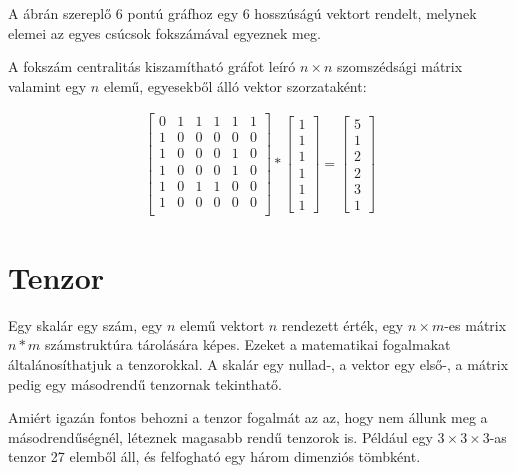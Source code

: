 \documentclass[12pt,numbers=noenddot]{report}
\begin{document}
\vspace{0.5cm}

A ábrán szereplő 6 pontú gráfhoz egy 6 hosszúságú vektort rendelt, 
melynek elemei az egyes csúcsok fokszámával egyeznek meg.

A fokszám centralitás kiszamítható gráfot leíró $n \times n$ szomszédsági 
mátrix valamint egy $n$ elemű, egyesekből álló vektor szorzataként:

\begin{align}
	\begin{bmatrix}
		0 & 1 & 1 & 1 & 1 & 1 \\
		1 & 0 & 0 & 0 & 0 & 0 \\
		1 & 0 & 0 & 0 & 1 & 0 \\
		1 & 0 & 0 & 0 & 1 & 0 \\
		1 & 0 & 1 & 1 & 0 & 0 \\
		1 & 0 & 0 & 0 & 0 & 0 \\
	\end{bmatrix}
	*
	\begin{bmatrix}
		1\\
		1\\
		1\\
		1\\
		1\\
		1
	\end{bmatrix}
	=
	\begin{bmatrix}
		5\\
		1\\
		2\\
		2\\
		3\\
		1
	\end{bmatrix}
\end{align}


\section{Tenzor}

Egy skalár egy szám, egy $n$ elemű vektort $n$ rendezett érték, egy 
$n \times m$-es mátrix $n*m$ számstruktúra tárolására képes. 
Ezeket a matematikai fogalmakat általánosíthatjuk a tenzorokkal. 
A skalár egy nullad-, a vektor egy első-, a mátrix pedig egy másodrendű tenzornak 
tekinthatő.

Amiért igazán fontos behozni a tenzor fogalmát az az, hogy nem állunk meg a 
másodrendűségnél, léteznek magasabb rendű tenzorok is. Például egy 
$3 \times 3 \times 3$-as tenzor 27 elemből áll, és felfogható egy három 
dimenziós tömbként.
\end{document}
